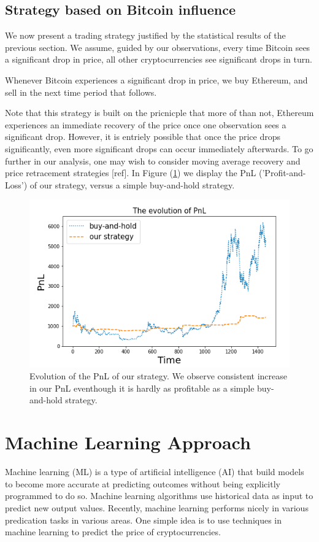 \documentclass[twoside]{report}
\begin{document}
\begin{spacing}{1}
\subsection{Strategy based on Bitcoin influence}

We now present a trading strategy justified by the statistical results of the previous section. We assume, guided by our observations, every time Bitcoin sees a significant drop in price, all other cryptocurrencies see significant drops in turn. \begin{strategy}
Whenever Bitcoin experiences a significant drop in price, we buy Ethereum, and sell in the next time period that follows.
\end{strategy} 
Note that this strategy is built on the pricnicple that more of than not,  Ethereum experiences an immediate recovery of the price once one observation sees a significant drop. However, it is entriely possible that once the price drops significantly, even more significant drops can occur immediately afterwards. To go further in our analysis, one may wish to consider moving average recovery and price retracement strategies [ref]. In Figure (\ref{fig:backtested_strategy_2}) we display the PnL ('Profit-and-Loss') of our strategy, versus a simple buy-and-hold strategy. 

\begin{figure}[!htbp]
    \centering
    \includegraphics[width=0.8\linewidth]{Causality_between_time_series/backtested_strategy_2.png}
    \caption{Evolution of the PnL of our strategy. We observe consistent increase in our PnL eventhough it is hardly as profitable as a simple buy-and-hold strategy.}
    \label{fig:backtested_strategy_2}
\end{figure}



\section{Machine Learning Approach}
Machine learning (ML) is a type of artificial intelligence (AI) that build models to become more accurate at predicting outcomes without being explicitly programmed to do so. Machine learning algorithms use historical data as input to predict new output values. Recently, machine learning performs nicely in various predication tasks in various areas. One simple idea is to use techniques in machine learning to predict the price of cryptocurrencies.


\end{spacing}
\end{document}
